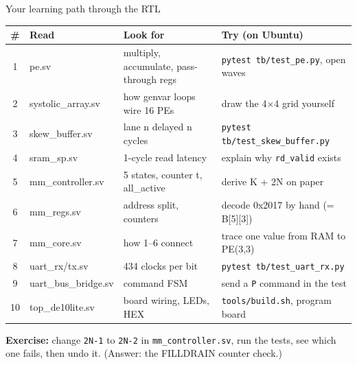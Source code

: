 \documentclass[aspectratio=169,11pt]{beamer}
\newcommand{\file}[1]{\texttt{\textcolor{copper}{#1}}}
\newcommand{\sig}[1]{\texttt{#1}}
\begin{document}
\begin{frame}{Your learning path through the RTL}
  \scriptsize
  \begin{tabular}{@{}c p{30mm} p{50mm} p{48mm}@{}}
    \toprule
    \textbf{\#} & \textbf{Read} & \textbf{Look for} & \textbf{Try (on Ubuntu)} \\
    \midrule
    1 & pe.sv & multiply, accumulate, pass-through regs & \sig{pytest tb/test\_pe.py}, open waves \\
    2 & systolic\_array.sv & how genvar loops wire 16 PEs & draw the 4$\times$4 grid yourself \\
    3 & skew\_buffer.sv & lane n delayed n cycles & \sig{pytest tb/test\_skew\_buffer.py} \\
    4 & sram\_sp.sv & 1-cycle read latency & explain why \sig{rd\_valid} exists \\
    5 & mm\_controller.sv & 5 states, counter t, all\_active & derive K + 2N on paper \\
    6 & mm\_regs.sv & address split, counters & decode 0x2017 by hand (= B[5][3]) \\
    7 & mm\_core.sv & how 1--6 connect & trace one value from RAM to PE(3,3) \\
    8 & uart\_rx/tx.sv & 434 clocks per bit & \sig{pytest tb/test\_uart\_rx.py} \\
    9 & uart\_bus\_bridge.sv & command FSM & send a \texttt{P} command in the test \\
    10 & top\_de10lite.sv & board wiring, LEDs, HEX & \sig{tools/build.sh}, program board \\
    \bottomrule
  \end{tabular}
  \vspace{2mm}

  \small\textbf{Exercise:} change \sig{2N-1} to \sig{2N-2} in \file{mm\_controller.sv}, run the tests,
  see which one fails, then undo it. (Answer: the FILLDRAIN counter check.)
\end{frame}
\end{document}

